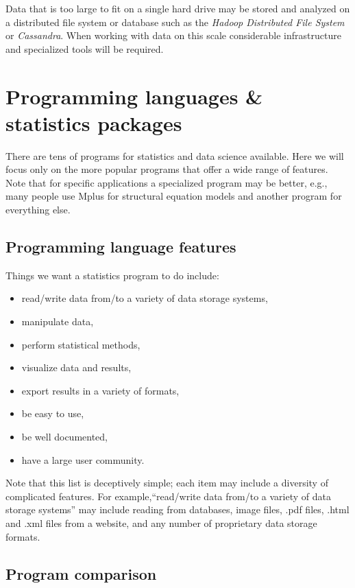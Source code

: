 \documentclass[]{book}
\providecommand{\tightlist}{%
  \setlength{\itemsep}{0pt}\setlength{\parskip}{0pt}}
\begin{document}
Data that is too large to fit on a single hard drive may be stored and
analyzed on a distributed file system or database such as the
\emph{Hadoop Distributed File System} or \emph{Cassandra}. When working
with data on this scale considerable infrastructure and specialized
tools will be required.

\section{Programming languages \& statistics
packages}\label{programming-languages-statistics-packages}

There are tens of programs for statistics and data science available.
Here we will focus only on the more popular programs that offer a wide
range of features. Note that for specific applications a specialized
program may be better, e.g., many people use Mplus for structural
equation models and another program for everything else.

\subsection{Programming language
features}\label{programming-language-features}

Things we want a statistics program to do include:

\begin{itemize}
\tightlist
\item
  read/write data from/to a variety of data storage systems,
\item
  manipulate data,
\item
  perform statistical methods,
\item
  visualize data and results,
\item
  export results in a variety of formats,
\item
  be easy to use,
\item
  be well documented,
\item
  have a large user community.
\end{itemize}

Note that this list is deceptively simple; each item may include a
diversity of complicated features. For example,``read/write data from/to
a variety of data storage systems'' may include reading from databases,
image files, .pdf files, .html and .xml files from a website, and any
number of proprietary data storage formats.

\subsection{Program comparison}\label{program-comparison}
\end{document}
